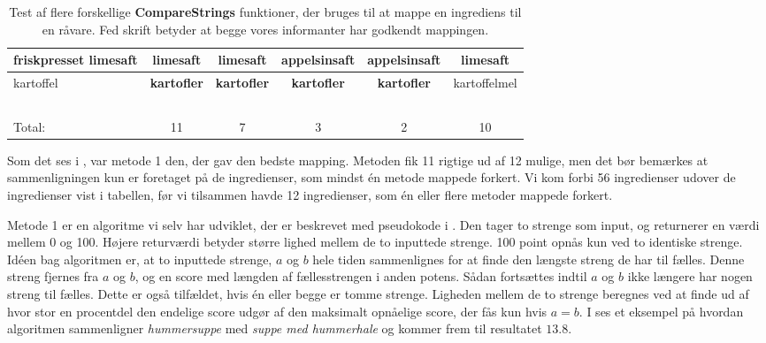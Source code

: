 \begin{table}
\begin{tabular}{|p{2cm}|c|c|c|c|c|}
        friskpresset limesaft                                      & \textbf{limesaft}        & \textbf{limesaft}                & appelsinsaft       & appelsinsaft       & \textbf{limesaft}        \\ \hline
        kartoffel                                                  & \textbf{kartofler}       & \textbf{kartofler}               & \textbf{kartofler}          & \textbf{kartofler}          & kartoffelmel    \\ \hline
        ~                                                          & ~               & ~                       & ~                  & ~                  & ~               \\ \hline
        Total:                                                     & 11              & 7                       & 3                  & 2                  & 10              \\
        \hline
    \end{tabular}
  \caption{Test af flere forskellige \textbf{CompareStrings} funktioner, der bruges til at mappe en ingrediens til en råvare. Fed skrift betyder at begge vores informanter har godkendt mappingen.}  \label{table:test-af-compares}
\end{table}

Som det ses i , var metode 1 den, der gav den bedste mapping. Metoden fik 11 rigtige ud af 12 mulige, men det bør bemærkes at sammenligningen kun er foretaget på de ingredienser, som mindst én metode mappede forkert. Vi kom forbi 56 ingredienser udover de ingredienser vist i tabellen, før vi tilsammen havde 12 ingredienser, som én eller flere metoder mappede forkert. 

Metode 1 er en algoritme vi selv har udviklet, der er beskrevet med pseudokode i . Den tager to strenge som input, og returnerer en værdi mellem 0 og 100. Højere returværdi betyder større lighed mellem de to inputtede strenge. 100 point opnås kun ved to identiske strenge. Idéen bag algoritmen er, at to inputtede strenge, $a$ og $b$ hele tiden sammenlignes for at finde den længste streng de har til fælles. Denne streng fjernes fra $a$ og $b$, og en score med længden af fællesstrengen i anden potens. Sådan fortsættes indtil $a$ og $b$ ikke længere har nogen streng til fælles. Dette er også tilfældet, hvis én eller begge er tomme strenge. Ligheden mellem de to strenge beregnes ved at finde ud af hvor stor en procentdel den endelige score udgør af den maksimalt opnåelige score, der fås kun hvis $a = b$.
I  ses et eksempel på hvordan algoritmen sammenligner \textit{hummersuppe} med \textit{suppe med hummerhale} og kommer frem til resultatet $13.8$.

